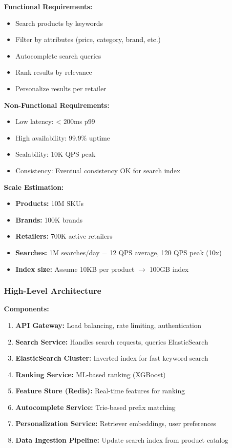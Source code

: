 \documentclass[11pt,letterpaper]{article}
\begin{document}
\textbf{Functional Requirements:}
\begin{itemize}
    \item Search products by keywords
    \item Filter by attributes (price, category, brand, etc.)
    \item Autocomplete search queries
    \item Rank results by relevance
    \item Personalize results per retailer
\end{itemize}

\textbf{Non-Functional Requirements:}
\begin{itemize}
    \item Low latency: < 200ms p99
    \item High availability: 99.9\% uptime
    \item Scalability: 10K QPS peak
    \item Consistency: Eventual consistency OK for search index
\end{itemize}

\textbf{Scale Estimation:}
\begin{itemize}
    \item \textbf{Products:} 10M SKUs
    \item \textbf{Brands:} 100K brands
    \item \textbf{Retailers:} 700K active retailers
    \item \textbf{Searches:} 1M searches/day = 12 QPS average, 120 QPS peak (10x)
    \item \textbf{Index size:} Assume 10KB per product $\rightarrow$ 100GB index
\end{itemize}

\subsubsection{High-Level Architecture}

\textbf{Components:}

\begin{enumerate}
    \item \textbf{API Gateway:} Load balancing, rate limiting, authentication
    \item \textbf{Search Service:} Handles search requests, queries ElasticSearch
    \item \textbf{ElasticSearch Cluster:} Inverted index for fast keyword search
    \item \textbf{Ranking Service:} ML-based ranking (XGBoost)
    \item \textbf{Feature Store (Redis):} Real-time features for ranking
    \item \textbf{Autocomplete Service:} Trie-based prefix matching
    \item \textbf{Personalization Service:} Retriever embeddings, user preferences
    \item \textbf{Data Ingestion Pipeline:} Update search index from product catalog
\end{enumerate}
\end{document}
